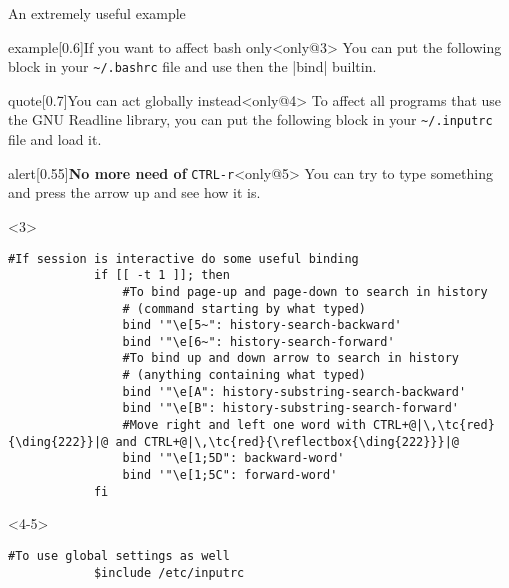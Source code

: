 \begin{frame}[fragile]{An extremely useful example}
    \begin{overlayarea}{\textwidth}{0.16\textheight}
        \vspace{-6mm}
        \begin{varblock}{example}[0.6\textwidth]{If you want to affect bash only}<only@3>
            You can put the following block in your \texttt{\textasciitilde/.bashrc} file and use then the \bash|bind| builtin.
        \end{varblock}
        \begin{varblock}{quote}[0.7\textwidth]{You can act globally instead}<only@4>
            \textnormal{To affect all programs that use the GNU Readline library, you can put the following block in your \texttt{\textasciitilde/.inputrc} file and load it.}
        \end{varblock}
        \begin{varblock}{alert}[0.55\textwidth]{\textbf{No more need of} \texttt{CTRL-r}}<only@5>
            You can try to type something and press the arrow up and see how it is.
        \end{varblock}
    \end{overlayarea}
    \begin{onlyenv}<3>
        \begin{lstlisting}[style=myBash, numbers=none]
            #If session is interactive do some useful binding
            if [[ -t 1 ]]; then
                #To bind page-up and page-down to search in history
                # (command starting by what typed)
                bind '"\e[5~": history-search-backward'
                bind '"\e[6~": history-search-forward'
                #To bind up and down arrow to search in history
                # (anything containing what typed)
                bind '"\e[A": history-substring-search-backward'
                bind '"\e[B": history-substring-search-forward'
                #Move right and left one word with CTRL+@|\,\tc{red}{\ding{222}}|@ and CTRL+@|\,\tc{red}{\reflectbox{\ding{222}}}|@
                bind '"\e[1;5D": backward-word'
                bind '"\e[1;5C": forward-word'
            fi
        \end{lstlisting}
    \end{onlyenv}
    \begin{onlyenv}<4-5>
        \begin{lstlisting}[style=myBash, numbers=none, commentstyle=\color{Gray}]
            #To use global settings as well
            $include /etc/inputrc


\end{lstlisting}
\end{onlyenv}
\end{frame}
